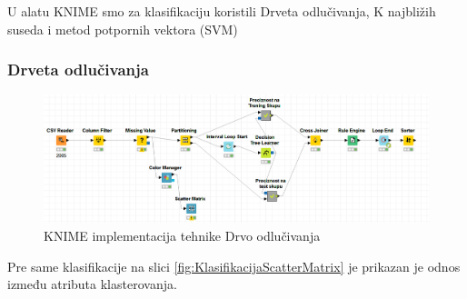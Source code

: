 \documentclass[a4paper]{article}
\begin{document}
U alatu  KNIME smo za klasifikaciju koristili Drveta odlučivanja, K najbližih suseda i metod potpornih vektora (SVM)

\subsubsection{Drveta odlučivanja}

\begin{figure}[h!]
	\begin{center}
		\includegraphics[scale=0.45]{Klasifikacija/DrvoOdlucivanja/KNIME_DrvoOdlucivanjaCvorovi.png}
	\end{center}
	\caption{KNIME implementacija tehnike Drvo odlučivanja}
	\label{fig:KNIME_CvoroviKlasifikacija}
\end{figure}

Pre same klasifikacije na slici \ref{fig:KlasifikacijaScatterMatrix} je prikazan je odnos između atributa klasterovanja.
\end{document}
